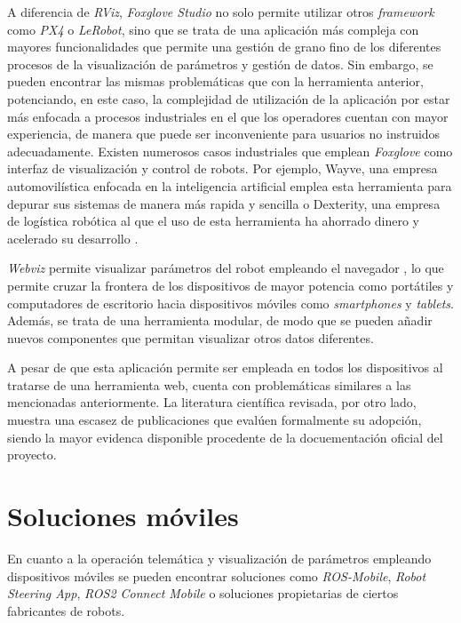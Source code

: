 A diferencia de \textit{RViz}, \textit{Foxglove Studio} no solo permite 
utilizar otros \textit{framework} como \textit{PX4} o \textit{LeRobot}, sino 
que se trata de una aplicación más compleja con mayores funcionalidades que 
permite una gestión de grano fino de los diferentes procesos de la visualización 
de parámetros y gestión de datos. Sin embargo, se pueden encontrar las mismas problemáticas
que con la herramienta anterior, potenciando, en este caso, la complejidad de utilización
de la aplicación por estar más enfocada a procesos industriales en el que los 
operadores cuentan con mayor experiencia, de manera que puede ser inconveniente para 
usuarios no instruidos adecuadamente. Existen numerosos casos industriales que emplean \textit{Foxglove}
como interfaz de visualización y control de robots. Por ejemplo, Wayve, una empresa automovilística enfocada 
en la inteligencia artificial emplea esta herramienta para depurar sus sistemas de manera más rapida y sencilla \parencite{foxgloveWayveCustomer} o
Dexterity, una empresa de logística robótica al que el uso de esta herramienta ha ahorrado dinero y acelerado su desarrollo \parencite{foxgloveDexterityCustomer}.

\textit{Webviz} permite visualizar parámetros del robot empleando el navegador \parencite{webvizWebviz},
lo que permite cruzar la frontera de los dispositivos de mayor potencia como 
portátiles y computadores de escritorio hacia dispositivos móviles como \textit{smartphones}
y \textit{tablets}. Además, se trata de una herramienta modular, de modo que se pueden 
añadir nuevos componentes que permitan visualizar otros datos diferentes.

A pesar de que esta aplicación permite ser empleada en todos los dispositivos al 
tratarse de una herramienta web, cuenta con problemáticas similares a las mencionadas
anteriormente. La literatura científica revisada, por otro lado, muestra una escasez de publicaciones
que evalúen formalmente su adopción, siendo la mayor evidenca disponible procedente de la docuementación
oficial del proyecto.

\section{Soluciones móviles}
En cuanto a la operación telemática y visualización de parámetros empleando 
dispositivos móviles se pueden encontrar soluciones como \textit{ROS-Mobile}, 
\textit{Robot Steering App}, \textit{ROS2 Connect Mobile} o soluciones 
propietarias de ciertos fabricantes de robots.

